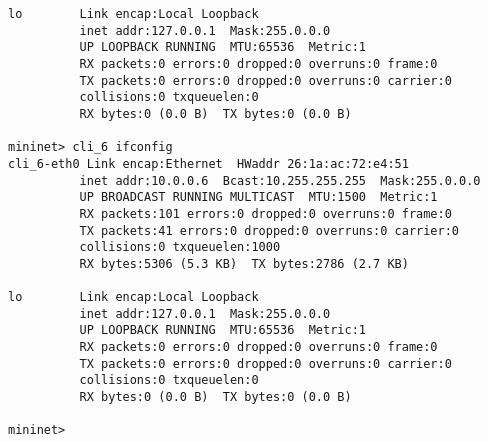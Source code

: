 \documentclass{article}
\begin{document}
\begin{Verbatim}
lo        Link encap:Local Loopback
          inet addr:127.0.0.1  Mask:255.0.0.0
          UP LOOPBACK RUNNING  MTU:65536  Metric:1
          RX packets:0 errors:0 dropped:0 overruns:0 frame:0
          TX packets:0 errors:0 dropped:0 overruns:0 carrier:0
          collisions:0 txqueuelen:0
          RX bytes:0 (0.0 B)  TX bytes:0 (0.0 B)

mininet> cli_6 ifconfig
cli_6-eth0 Link encap:Ethernet  HWaddr 26:1a:ac:72:e4:51
          inet addr:10.0.0.6  Bcast:10.255.255.255  Mask:255.0.0.0
          UP BROADCAST RUNNING MULTICAST  MTU:1500  Metric:1
          RX packets:101 errors:0 dropped:0 overruns:0 frame:0
          TX packets:41 errors:0 dropped:0 overruns:0 carrier:0
          collisions:0 txqueuelen:1000
          RX bytes:5306 (5.3 KB)  TX bytes:2786 (2.7 KB)

lo        Link encap:Local Loopback
          inet addr:127.0.0.1  Mask:255.0.0.0
          UP LOOPBACK RUNNING  MTU:65536  Metric:1
          RX packets:0 errors:0 dropped:0 overruns:0 frame:0
          TX packets:0 errors:0 dropped:0 overruns:0 carrier:0
          collisions:0 txqueuelen:0
          RX bytes:0 (0.0 B)  TX bytes:0 (0.0 B)

mininet>

\end{Verbatim}

\begin{thebibliography}{99}


\end{thebibliography}
\end{document}
